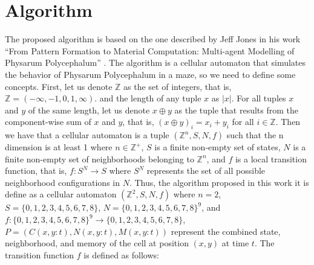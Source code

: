 \documentclass[conference]{IEEEtran}
\begin{document}
\section{Algorithm}
\label{sec:algorithm}
    The proposed algorithm is based on the one described by Jeff Jones in his work 
        “From Pattern Formation to Material Computation: Multi-agent Modelling of Physarum Polycephalum” \cite{Jones2015}. 
    \vskip 0.2cm
    The algorithm is a cellular automaton that simulates the behavior of Physarum Polycephalum in a maze, so we need to define some concepts.
        First, let us denote $\mathbb{Z}$ as the set of integers, that is, $\mathbb{Z} = (-\infty, -1, 0, 1, \infty)$.
        and the length of any tuple $x$ as $|x|$. For all tuples $x$ and $y$ of the same length, let us denote $x \oplus y$
        as the tuple that results from the component-wise sum of $x$ and $y$, that is, $(x \oplus y)_i = x_i + y_i$ for all
        $i \in \mathbb{Z}$.
    \vskip 0.2cm
    Then we have that a cellular automaton is a tuple $(\mathbb{Z}^{n}, S, N, f)$ such that the n dimension is at least 1 where 
        $n \in \mathbb{Z}^{+}$, $S$ is a finite non-empty set of states, $N$ is a finite non-empty set of neighborhoods 
        belonging to $\mathbb{Z}^{n}$, and $f$ is a local transition function, that is, $f: S^N \rightarrow S$ where
        $S^N$ represents the set of all possible neighborhood configurations in $N$.
    \vskip 0.2cm
    Thus, the algorithm proposed in this work it is define as a cellular automaton $(\mathbb{Z}^{2}, S, N, f)$ where $n = 2$, 
        $S = \{0, 1, 2, 3, 4, 5, 6, 7, 8\}$, $N = \{0, 1, 2, 3, 4, 5, 6, 7, 8\}^9$, 
        and $f : \{0, 1, 2, 3, 4, 5, 6, 7, 8\}^9 \rightarrow \{0, 1, 2, 3, 4, 5, 6, 7, 8\}$,\( P = (C(x,y:t), N(x,y:t), M(x,y:t)) \) 
        represent the combined state, neighborhood, and memory of the cell at position \((x, y)\) at time \( t \). The transition function 
        \( f \) is defined as follows:
\end{document}
